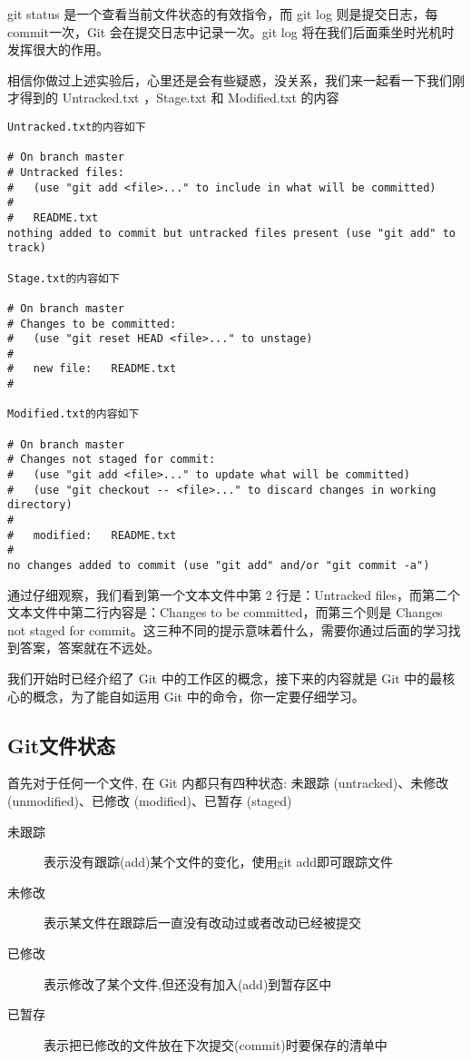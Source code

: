 \begin{note}
git status 是一个查看当前文件状态的有效指令，而 git log 则是提交日志，每commit一次，Git 会在提交日志中记录一次。git log 将在我们后面乘坐时光机时发挥很大的作用。
\end{note}

相信你做过上述实验后，心里还是会有些疑惑，没关系，我们来一起看一下我们刚才得到的 Untracked.txt ，Stage.txt 和 Modified.txt 的内容
\begin{verbatim}
Untracked.txt的内容如下

# On branch master
# Untracked files:
#   (use "git add <file>..." to include in what will be committed)
#
#	README.txt
nothing added to commit but untracked files present (use "git add" to track)

Stage.txt的内容如下

# On branch master
# Changes to be committed:
#   (use "git reset HEAD <file>..." to unstage)
#
#	new file:   README.txt
#

Modified.txt的内容如下

# On branch master
# Changes not staged for commit:
#   (use "git add <file>..." to update what will be committed)
#   (use "git checkout -- <file>..." to discard changes in working directory)
#
#	modified:   README.txt
#
no changes added to commit (use "git add" and/or "git commit -a")
\end{verbatim}
通过仔细观察，我们看到第一个文本文件中第 2 行是：Untracked files，而第二个文本文件中第二行内容是：Changes to be committed，而第三个则是 Changes not staged for commit。这三种不同的提示意味着什么，需要你通过后面的学习找到答案，答案就在不远处。

我们开始时已经介绍了 Git 中的工作区的概念，接下来的内容就是 Git 中的最核心的概念，为了能自如运用 Git 中的命令，你一定要仔细学习。

\subsection{Git文件状态}
首先对于任何一个文件, 在 Git 内都只有四种状态: 未跟踪 (untracked)、未修改 (unmodified)、已修改 (modified)、已暂存 (staged)
\begin{description}
\item[未跟踪] 表示没有跟踪(add)某个文件的变化，使用git add即可跟踪文件
\item[未修改] 表示某文件在跟踪后一直没有改动过或者改动已经被提交
\item[已修改] 表示修改了某个文件,但还没有加入(add)到暂存区中
\item[已暂存] 表示把已修改的文件放在下次提交(commit)时要保存的清单中
\end{description}

